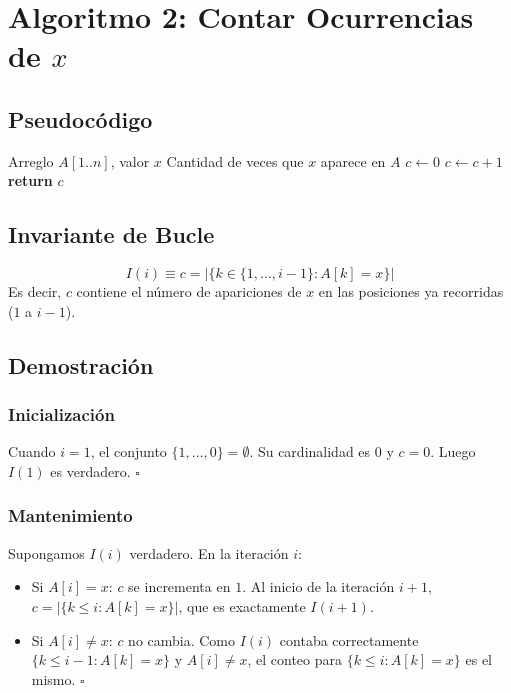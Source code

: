 \documentclass[11pt,a4paper]{article}
\newcommand{\inv}{I}
\begin{document}
\section{Algoritmo 2: Contar Ocurrencias de \(x\)}

\subsection{Pseudocódigo}
\begin{algorithm}[H]
\caption{Contar Ocurrencias}
\begin{algorithmic}[1]
\Require Arreglo $A[1..n]$, valor $x$
\Ensure Cantidad de veces que $x$ aparece en $A$
\State $c \gets 0$
        \State $c \gets c + 1$
    \EndIf
\EndFor
\State \textbf{return} $c$
\end{algorithmic}
\end{algorithm}

\subsection{Invariante de Bucle}
\[
\boxed{\inv(i) \equiv c = |\{k \in \{1, \ldots, i-1\} : A[k] = x\}|}
\]
Es decir, $c$ contiene el número de apariciones de $x$ en las posiciones ya recorridas ($1$ a $i-1$).

\subsection{Demostración}

\subsubsection{Inicialización}
Cuando $i = 1$, el conjunto $\{1, \ldots, 0\} = \emptyset$. Su cardinalidad es $0$ y $c = 0$. Luego $\inv(1)$ es verdadero. $\square$

\subsubsection{Mantenimiento}
Supongamos $\inv(i)$ verdadero. En la iteración $i$:
\begin{itemize}
    \item Si $A[i] = x$: $c$ se incrementa en $1$. Al inicio de la iteración $i+1$, $c = |\{k \leq i : A[k] = x\}|$, que es exactamente $\inv(i+1)$.
    \item Si $A[i] \neq x$: $c$ no cambia. Como $\inv(i)$ contaba correctamente $\{k \leq i-1 : A[k]=x\}$ y $A[i] \neq x$, el conteo para $\{k \leq i : A[k]=x\}$ es el mismo. $\square$
\end{itemize}
\end{document}
